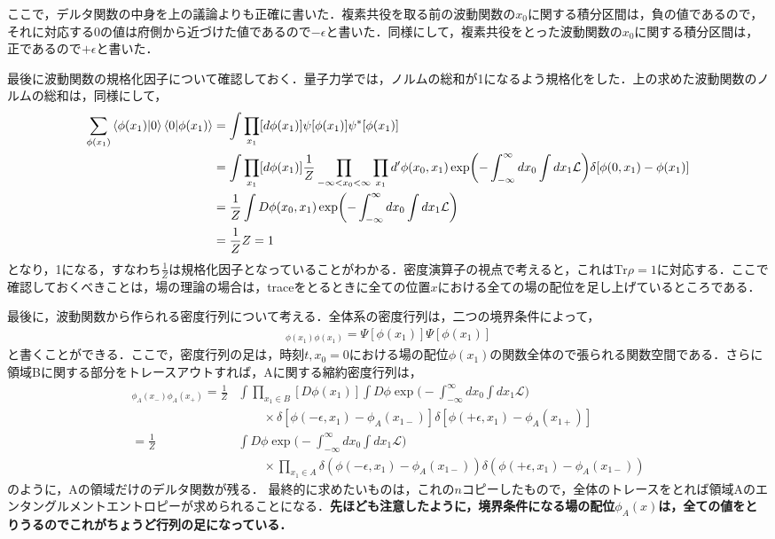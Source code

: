 ここで，デルタ関数の中身を上の議論よりも正確に書いた．複素共役を取る前の波動関数の$x_0$に関する積分区間は，負の値であるので，それに対応する$0$の値は府側から近づけた値であるので$-\epsilon$と書いた．同様にして，複素共役をとった波動関数の$x_0$に関する積分区間は，正であるので$+\epsilon$と書いた．

最後に波動関数の規格化因子について確認しておく．量子力学では，ノルムの総和が1になるよう規格化をした．上の求めた波動関数のノルムの総和は，同様にして，
\begin{align}
  \sum_{\phi(x_1)}\braket{\phi(x_1)|0}\braket{0|\phi(x_1)}&=\int\prod_{x_1}[d\phi(x_1)]\psi[\phi(x_{1})]\psi^{*}[\phi(x_{1})] \\
  &=\int\prod_{x_1}[d\phi(x_1)]\frac{1}{Z}\prod_{-\infty<x_0<\infty}\prod_{x_1}d^{\prime}\phi(x_0,x_1) \exp\biggl(-\int^{\infty}_{-\infty}dx_0\int dx_1\mathcal{L}\biggr)\delta[\phi(0,x_1)-\phi(x_1)]\\
  &=\frac{1}{Z}\int D\phi(x_0,x_1) \exp\biggl(-\int^{\infty}_{-\infty}dx_0\int dx_1\mathcal{L}\biggr)\\
  &=\frac{1}{Z}Z=1
\end{align}
となり，1になる，すなわち$\frac{1}{Z}$は規格化因子となっていることがわかる．密度演算子の視点で考えると，これは$\mathrm{Tr}\rho=1$に対応する．ここで確認しておくべきことは，場の理論の場合は，traceをとるときに全ての位置$x$における全ての場の配位を足し上げているところである．

最後に，波動関数から作られる密度行列について考える．全体系の密度行列は，二つの境界条件によって，
\begin{align}
  [\rho_{tot}]_{\phi(x_1)\phi(x_1)}=\Psi[\phi(x_1)]\Psi[\phi(x_1)]
\end{align}
と書くことができる．ここで，密度行列の足は，時刻$t,x_0=0$における場の配位$\phi(x_1)$の関数全体ので張られる関数空間である．さらに領域Bに関する部分をトレースアウトすれば，Aに関する縮約密度行列は，
\begin{align}
  [\rho_{A}]_{\phi_A(x_-)\phi_A(x_+)}=\frac{1}{Z}&\int\prod_{x_1 \in B}[D\phi(x_1)]\int D\phi \exp\biggl(-\int_{-\infty}^{\infty}dx_0\int dx_1\mathcal{L}\biggr)\nonumber \\
  &\qquad \times\delta[\phi(-\epsilon,x_1)-\phi_{A}(x_{1-})]\delta[\phi(+\epsilon,x_1)-\phi_{A}(x_{1+})] \\
  =\frac{1}{Z}&\int D\phi \exp\biggl(-\int_{-\infty}^{\infty}dx_0\int dx_1\mathcal{L}\biggr)\\
  &\qquad
  \times\prod_{x_1\in A}\delta(\phi(-\epsilon,x_1)-\phi_{A}(x_{1-}))\delta(\phi(+\epsilon,x_1)-\phi_{A}(x_{1-}))
\end{align}
のように，Aの領域だけのデルタ関数が残る．
最終的に求めたいものは，これの$n$コピーしたもので，全体のトレースをとれば領域Aのエンタングルメントエントロピーが求められることになる．\textbf{先ほども注意したように，境界条件になる場の配位$\phi_{A}(x)$は，全ての値をとりうるのでこれがちょうど行列の足になっている．}

